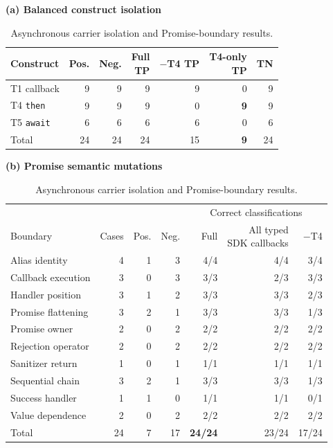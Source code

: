 \begin{table}[tbp]
\centering
\caption{Asynchronous carrier isolation and Promise-boundary results.}
\label{tab:asyncbench}
\papertablestyle
\begin{minipage}[t]{0.40\columnwidth}
\centering
\textbf{(a) Balanced construct isolation}\\[-2pt]
\setlength{\tabcolsep}{0.7pt}
\begin{tabular*}{\linewidth}{@{\extracolsep{\fill}}lrrrrrr@{}}
\toprule
Construct & Pos. & Neg. & \makecell{Full\\TP} & \makecell{$-$T4\\TP} & \makecell{T4-only\\TP} & TN \\
\midrule
T1 callback & 9 & 9 & 9 & 9 & 0 & 9 \\
T4 \texttt{then} & 9 & 9 & 9 & 0 & \textbf{9} & 9 \\
T5 \texttt{await} & 6 & 6 & 6 & 6 & 0 & 6 \\
\midrule
Total & 24 & 24 & 24 & 15 & \textbf{9} & 24 \\
\bottomrule
\end{tabular*}
\end{minipage}\hfill
\begin{minipage}[t]{0.58\columnwidth}
\centering
\textbf{(b) Promise semantic mutations}\\[-2pt]
\setlength{\tabcolsep}{0.7pt}
\begin{tabular*}{\linewidth}{@{\extracolsep{\fill}}lrrrrrr@{}}
\toprule
& & & & \multicolumn{3}{c}{Correct classifications} \\
\cmidrule(lr){5-7}
Boundary & Cases & Pos. & Neg. & Full & \makecell{All typed\\SDK callbacks} & $-$T4 \\
\midrule
Alias identity & 4 & 1 & 3 & 4/4 & 4/4 & 3/4 \\
Callback execution & 3 & 0 & 3 & 3/3 & 2/3 & 3/3 \\
Handler position & 3 & 1 & 2 & 3/3 & 3/3 & 2/3 \\
Promise flattening & 3 & 2 & 1 & 3/3 & 3/3 & 1/3 \\
Promise owner & 2 & 0 & 2 & 2/2 & 2/2 & 2/2 \\
Rejection operator & 2 & 0 & 2 & 2/2 & 2/2 & 2/2 \\
Sanitizer return & 1 & 0 & 1 & 1/1 & 1/1 & 1/1 \\
Sequential chain & 3 & 2 & 1 & 3/3 & 3/3 & 1/3 \\
Success handler & 1 & 1 & 0 & 1/1 & 1/1 & 0/1 \\
Value dependence & 2 & 0 & 2 & 2/2 & 2/2 & 2/2 \\
\midrule
Total & 24 & 7 & 17 & \textbf{24/24} & 23/24 & 17/24 \\
\bottomrule
\end{tabular*}
\end{minipage}
\end{table}

